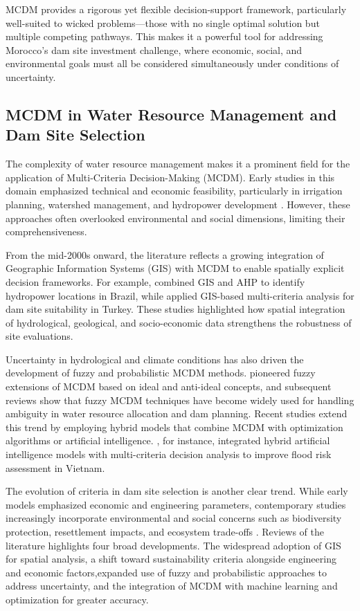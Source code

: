 MCDM provides a rigorous yet flexible decision-support framework, particularly well-suited to wicked problems—those with no single optimal solution but multiple competing pathways. This makes it a powerful tool for addressing Morocco’s dam site investment challenge, where economic, social, and environmental goals must all be considered simultaneously under conditions of uncertainty.

\subsection{MCDM in Water Resource Management and Dam Site Selection}
The complexity of water resource management makes it a prominent field for the application of Multi-Criteria Decision-Making (MCDM). Early studies in this domain emphasized technical and economic feasibility, particularly in irrigation planning, watershed management, and hydropower development \cite{POHEKAR2004,Romanelli2018}. However, these approaches often overlooked environmental and social dimensions, limiting their comprehensiveness.

From the mid-2000s onward, the literature reflects a growing integration of Geographic Information Systems (GIS) with MCDM to enable spatially explicit decision frameworks. For example, \cite{Romanelli2018} combined GIS and AHP to identify hydropower locations in Brazil, while \cite{karakus2022} applied GIS-based multi-criteria analysis for dam site suitability in Turkey. These studies highlighted how spatial integration of hydrological, geological, and socio-economic data strengthens the robustness of site evaluations.

Uncertainty in hydrological and climate conditions has also driven the development of fuzzy and probabilistic MCDM methods. \cite{LIANG1999} pioneered fuzzy extensions of MCDM based on ideal and anti-ideal concepts, and subsequent reviews \cite{Mardani2015} show that fuzzy MCDM techniques have become widely used for handling ambiguity in water resource allocation and dam planning. Recent studies extend this trend by employing hybrid models that combine MCDM with optimization algorithms or artificial intelligence. \cite{PHAM2021}, for instance, integrated hybrid artificial intelligence models with multi-criteria decision analysis to improve flood risk assessment in Vietnam.

The evolution of criteria in dam site selection is another clear trend. While early models emphasized economic and engineering parameters, contemporary studies increasingly incorporate environmental and social concerns such as biodiversity protection, resettlement impacts, and ecosystem trade-offs \cite{Dirie2024,karakus2022}. Reviews of the literature highlights four broad developments. The widespread adoption of GIS for spatial analysis, a shift toward sustainability criteria alongside engineering and economic factors,expanded use of fuzzy and probabilistic approaches to address uncertainty, and the integration of MCDM with machine learning and optimization for greater accuracy.

